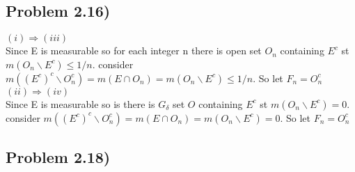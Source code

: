 \documentclass[paper=letter, fontsize=11pt]{scrartcl} %
\begin{document}
\subsection*{Problem 2.16)}
$(i) \Rightarrow (iii)$\\
Since E is measurable so for each integer n  there is open set $O_n$  containing $E^c$ st $m(O_n\backslash E^c) \leq 1/n$. consider $m((E^c)^c\backslash O_n ^c) =m(E \cap O_n)=m(O_n\backslash E^c) \leq 1/n$. So let $F_n = O_n ^c$ 
\\
$(ii) \Rightarrow (iv)$\\
Since E is measurable so is there is $G_\delta   $ set $O$ containing $E^c$ st $m(O_n\backslash E^c) =0$. consider $m((E^c)^c\backslash O_n ^c) =m(E \cap O_n)=m(O_n\backslash E^c)=0$. So let $F_n = O_n ^c$  


\subsection*{Problem 2.18)}
\end{document}
